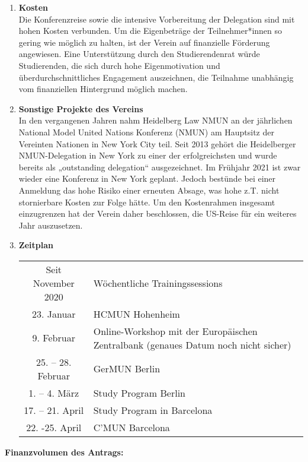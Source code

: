 {\begin{enumerate}
        \item \textbf{Kosten}\\Die Konferenzreise sowie die intensive Vorbereitung der Delegation sind mit hohen Kosten verbunden. Um die Eigenbeträge der Teilnehmer*innen so gering wie möglich zu halten, ist der Verein auf finanzielle Förderung angewiesen. Eine Unterstützung durch den Studierendenrat würde Studierenden, die sich durch hohe Eigenmotivation und überdurchschnittliches Engagement auszeichnen, die Teilnahme unabhängig vom finanziellen Hintergrund möglich machen.\\
        \item \textbf{Sonstige Projekte des Vereins}\\In den vergangenen Jahren nahm Heidelberg Law NMUN an der jährlichen National Model United Nations Konferenz (NMUN) am Hauptsitz der Vereinten Nationen in New York City teil. Seit 2013 gehört die Heidelberger NMUN-Delegation in New York zu einer der erfolgreichsten und wurde bereits als „outstanding delegation“ ausgezeichnet. Im Frühjahr 2021 ist zwar wieder eine Konferenz in New York geplant. Jedoch bestünde bei einer Anmeldung das hohe Risiko einer erneuten Absage, was hohe z.T. nicht stornierbare Kosten zur Folge hätte. Um den Kostenrahmen insgesamt einzugrenzen hat der Verein daher beschlossen, die US-Reise für ein weiteres Jahr auszusetzen.\\
        \item \textbf{Zeitplan}\\
        \begin{tabular}{c p{7cm}}
            Seit November 2020 & Wöchentliche Trainingssessions\\
            23. Januar & HCMUN Hohenheim\\
            9. Februar & Online-Workshop mit der Europäischen Zentralbank (genaues Datum noch nicht sicher)\\
            25. – 28. Februar & GerMUN Berlin\\
            1. – 4. März & Study Program Berlin\\
            17. – 21. April & Study Program in Barcelona\\
            22. -25. April & C’MUN Barcelona\\
        \end{tabular}
    \end{enumerate}
    \textbf{Finanzvolumen des Antrags:}\\
    \newline
    \begin{tabularx}{\textwidth}{X X}

\end{tabularx}}
